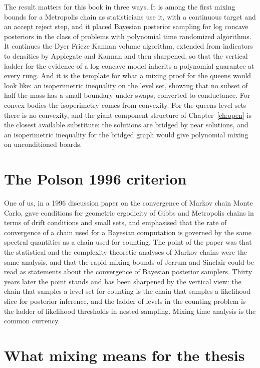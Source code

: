 The result matters for this book in three ways. It is among the first mixing bounds for a Metropolis chain as statisticians use it, with a continuous target and an accept reject step, and it placed Bayesian posterior sampling for log concave posteriors in the class of problems with polynomial time randomized algorithms. It continues the Dyer Frieze Kannan volume algorithm, extended from indicators to densities by Applegate and Kannan and then sharpened, so that the vertical ladder for the evidence of a log concave model inherits a polynomial guarantee at every rung. And it is the template for what a mixing proof for the queens would look like: an isoperimetric inequality on the level set, showing that no subset of half the mass has a small boundary under swaps, converted to conductance. For convex bodies the isoperimetry comes from convexity. For the queens level sets there is no convexity, and the giant component structure of Chapter~\ref{ch:open} is the closest available substitute: the solutions are bridged by near solutions, and an isoperimetric inequality for the bridged graph would give polynomial mixing on unconditioned boards.

\section{The Polson 1996 criterion}

One of us, in a 1996 discussion paper on the convergence of Markov chain Monte Carlo, gave conditions for geometric ergodicity of Gibbs and Metropolis chains in terms of drift conditions and small sets, and emphasised that the rate of convergence of a chain used for a Bayesian computation is governed by the same spectral quantities as a chain used for counting. The point of the paper was that the statistical and the complexity theoretic analyses of Markov chains were the same analysis, and that the rapid mixing bounds of Jerrum and Sinclair could be read as statements about the convergence of Bayesian posterior samplers. Thirty years later the point stands and has been sharpened by the vertical view: the chain that samples a level set for counting is the chain that samples a likelihood slice for posterior inference, and the ladder of levels in the counting problem is the ladder of likelihood thresholds in nested sampling. Mixing time analysis is the common currency.

\section{What mixing means for the thesis}


